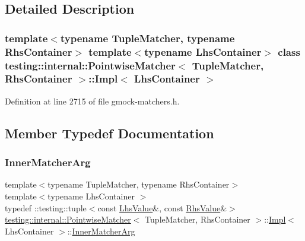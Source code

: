 \subsection{Detailed Description}
\subsubsection*{template$<$typename Tuple\+Matcher, typename Rhs\+Container$>$\newline
template$<$typename Lhs\+Container$>$\newline
class testing\+::internal\+::\+Pointwise\+Matcher$<$ Tuple\+Matcher, Rhs\+Container $>$\+::\+Impl$<$ Lhs\+Container $>$}



Definition at line 2715 of file gmock-\/matchers.\+h.



\subsection{Member Typedef Documentation}
\mbox{\label{classtesting_1_1internal_1_1PointwiseMatcher_1_1Impl_aba9d983881cbfbb37724b8b40e863898}} 
\subsubsection{\texorpdfstring{Inner\+Matcher\+Arg}{InnerMatcherArg}}
{\footnotesize\ttfamily template$<$typename Tuple\+Matcher, typename Rhs\+Container$>$ \\
template$<$typename Lhs\+Container $>$ \\
typedef \+::testing\+::tuple$<$const \hyperlink{classtesting_1_1internal_1_1PointwiseMatcher_1_1Impl_a453769e721f4212e399f76c980b4b65c}{Lhs\+Value}\&, const \hyperlink{classtesting_1_1internal_1_1PointwiseMatcher_a9f7f1abbfa795033e1e1c1df385b4617}{Rhs\+Value}\&$>$ \hyperlink{classtesting_1_1internal_1_1PointwiseMatcher}{testing\+::internal\+::\+Pointwise\+Matcher}$<$ Tuple\+Matcher, Rhs\+Container $>$\+::\hyperlink{classtesting_1_1internal_1_1PointwiseMatcher_1_1Impl}{Impl}$<$ Lhs\+Container $>$\+::\hyperlink{classtesting_1_1internal_1_1PointwiseMatcher_1_1Impl_aba9d983881cbfbb37724b8b40e863898}{Inner\+Matcher\+Arg}}



